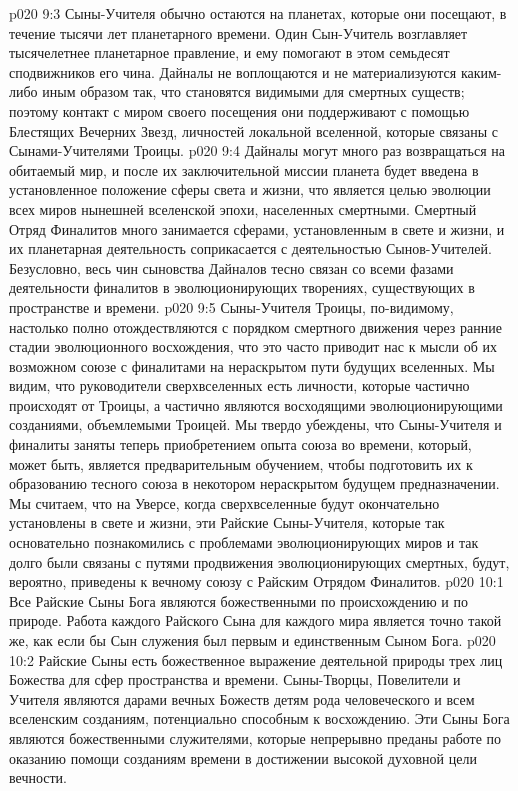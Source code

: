 \vs p020 9:3 Сыны\hyp{}Учителя обычно остаются на планетах, которые они посещают, в течение тысячи лет планетарного времени. Один Сын\hyp{}Учитель возглавляет тысячелетнее планетарное правление, и ему помогают в этом семьдесят сподвижников его чина. Дайналы не воплощаются и не материализуются каким\hyp{}либо иным образом так, что становятся видимыми для смертных существ; поэтому контакт с миром своего посещения они поддерживают с помощью Блестящих Вечерних Звезд, личностей локальной вселенной, которые связаны с Сынами\hyp{}Учителями Троицы.
\vs p020 9:4 Дайналы могут много раз возвращаться на обитаемый мир, и после их заключительной миссии планета будет введена в установленное положение сферы света и жизни, что является целью эволюции всех миров нынешней вселенской эпохи, населенных смертными. Смертный Отряд Финалитов много занимается сферами, установленным в свете и жизни, и их планетарная деятельность соприкасается с деятельностью Сынов\hyp{}Учителей. Безусловно, весь чин сыновства Дайналов тесно связан со всеми фазами деятельности финалитов в эволюционирующих творениях, существующих в пространстве и времени.
\vs p020 9:5 \pc Сыны\hyp{}Учителя Троицы, по\hyp{}видимому, настолько полно отождествляются с порядком смертного движения через ранние стадии эволюционного восхождения, что это часто приводит нас к мысли об их возможном союзе с финалитами на нераскрытом пути будущих вселенных. Мы видим, что руководители сверхвселенных есть личности, которые частично происходят от Троицы, а частично являются восходящими эволюционирующими созданиями, объемлемыми Троицей. Мы твердо убеждены, что Сыны\hyp{}Учителя и финалиты заняты теперь приобретением опыта союза во времени, который, может быть, является предварительным обучением, чтобы подготовить их к образованию тесного союза в некотором нераскрытом будущем предназначении. Мы считаем, что на Уверсе, когда сверхвселенные будут окончательно установлены в свете и жизни, эти Райские Сыны\hyp{}Учителя, которые так основательно познакомились с проблемами эволюционирующих миров и так долго были связаны с путями продвижения эволюционирующих смертных, будут, вероятно, приведены к вечному союзу с Райским Отрядом Финалитов.
\vs p020 10:1 Все Райские Сыны Бога являются божественными по происхождению и по природе. Работа каждого Райского Сына для каждого мира является точно такой же, как если бы Сын служения был первым и единственным Сыном Бога.
\enlargethispage*{-\baselineskip}%
\vs p020 10:2 Райские Сыны есть божественное выражение деятельной природы трех лиц Божества для сфер пространства и времени. Сыны\hyp{}Творцы, Повелители и Учителя являются дарами вечных Божеств детям рода человеческого и всем вселенским созданиям, потенциально способным к восхождению. Эти Сыны Бога являются божественными служителями, которые непрерывно преданы работе по оказанию помощи созданиям времени в достижении высокой духовной цели вечности.
